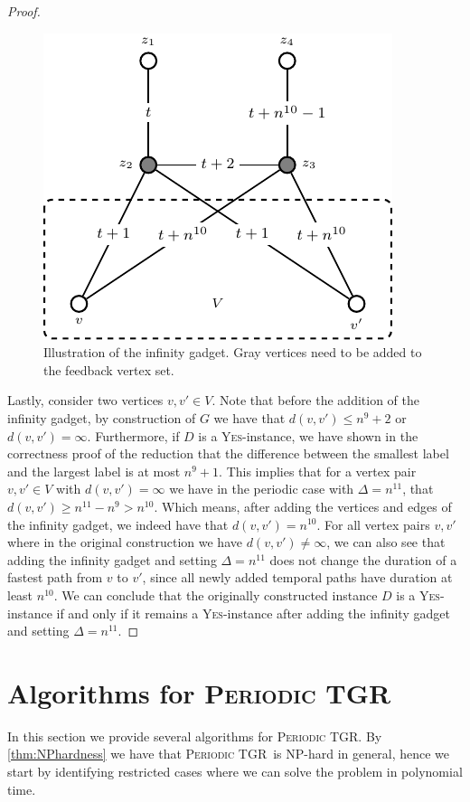 \documentclass[a4paper,UKenglish,cleveref, autoref, thm-restate, anonymous]{lipics-v2021}
\newcommand{\deltaExact}{\textsc{Periodic TGR}}
\begin{document}
\begin{proof}
\begin{figure}[t]
\includegraphics{fig-W1-infinity}
    \caption{Illustration of the infinity gadget. Gray vertices need to be added to the feedback vertex set.}\label{fig:hardness2}
\end{figure}

Lastly, consider two vertices $v,v'\in V$. Note that before the addition of the infinity gadget, by construction of $G$ we have that $d(v,v')\le n^9+2$ or $d(v,v')=\infty$. Furthermore, if $D$ is a \textsc{Yes}-instance, we have shown in the correctness proof of the reduction that the difference between the smallest label and the largest label is at most $n^9+1$. This implies that for a vertex pair $v,v'\in V$ with $d(v,v')=\infty$ we have in the periodic case with $\Delta=n^{11}$, that $d(v,v')\ge n^{11}-n^9>n^{10}$. Which means, after adding the vertices and edges of the infinity gadget, we indeed have that $d(v,v')=n^{10}$. For all vertex pairs $v,v'$ where in the original construction we have $d(v,v')\neq\infty$, we can also see that adding the infinity gadget and setting $\Delta=n^{11}$ does not change the duration of a fastest path from $v$ to $v'$, since all newly added temporal paths have duration at least $n^{10}$. We can conclude that the originally constructed instance $D$ is a \textsc{Yes}-instance if and only if it remains a \textsc{Yes}-instance after adding the infinity gadget and setting $\Delta=n^{11}$.
\end{proof}




\section{Algorithms for \deltaExact}\label{sec:algos}
In this section we provide several algorithms for \deltaExact. By \cref{thm:NPhardness} we have that \deltaExact\ is NP-hard in general, hence we start by identifying restricted cases where we can solve the problem in polynomial time.
\end{document}
